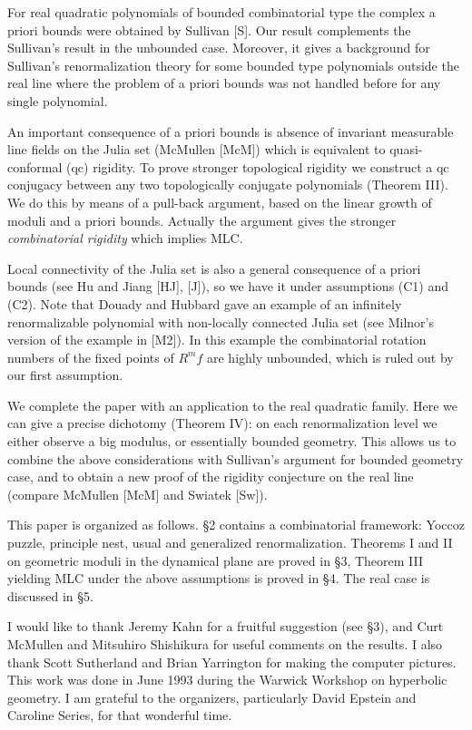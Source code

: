 For  real quadratic polynomials of bounded  combinatorial 
type the complex a priori bounds
were obtained by Sullivan [S]. Our 
result complements the Sullivan's result in the unbounded case.
Moreover, it gives a background for Sullivan's renormalization theory
for some bounded type polynomials outside the real line 
where the problem of a priori
bounds was not handled before for any single polynomial. 

An important consequence of a priori bounds is absence of invariant 
measurable line fields on the Julia set (McMullen [McM])
 which is equivalent to quasi-conformal (qc) rigidity. To prove 
stronger topological
rigidity we construct a qc conjugacy between any two
topologically conjugate polynomials (Theorem III). We do this by 
means of a pull-back argument, based on the linear growth of moduli
and a priori bounds. Actually the argument gives  the stronger
 {\sl combinatorial rigidity}  which implies MLC.

  

Local connectivity of
the Julia set  is also a general consequence of a priori bounds 
(see Hu and Jiang [HJ], [J]),
so we have it under assumptions (C1) and (C2). Note that 
  Douady and Hubbard gave an example of an infinitely
renormalizable polynomial with non-locally connected Julia set
 (see Milnor's version of the example in [M2]).
 In this example the combinatorial rotation numbers of
the fixed points of $R^m f$ are highly unbounded, which is ruled out by
our first assumption.


We complete the paper with an application to the real quadratic family.
Here we can give a precise dichotomy (Theorem IV): on each renormalization
level we either observe a big modulus, or essentially bounded geometry.
This allows us to combine the above considerations with Sullivan's
argument for bounded geometry case, and to obtain a new proof of the
rigidity conjecture on the real line (compare McMullen [McM] and Swiatek [Sw]).  

This paper is organized as follows.
\S 2 contains a combinatorial framework: Yoccoz puzzle, principle nest,
usual and generalized renormalization.
Theorems I and II on geometric moduli in the 
dynamical plane are proved in \S 3, 
Theorem III yielding MLC  under the above assumptions is proved in \S 4. 
 The real case is discussed in \S 5.

\medskip{} I would like to thank Jeremy Kahn
for a fruitful suggestion (see \S 3), and Curt McMullen
and Mitsuhiro Shishikura for useful comments on the results. 
I also thank Scott Sutherland and Brian Yarrington for making the 
computer pictures.
This work was done in June 1993 during the Warwick Workshop on
hyperbolic geometry. I am grateful to 
the organizers, particularly  David Epstein and Caroline Series, 
for that wonderful time. 


